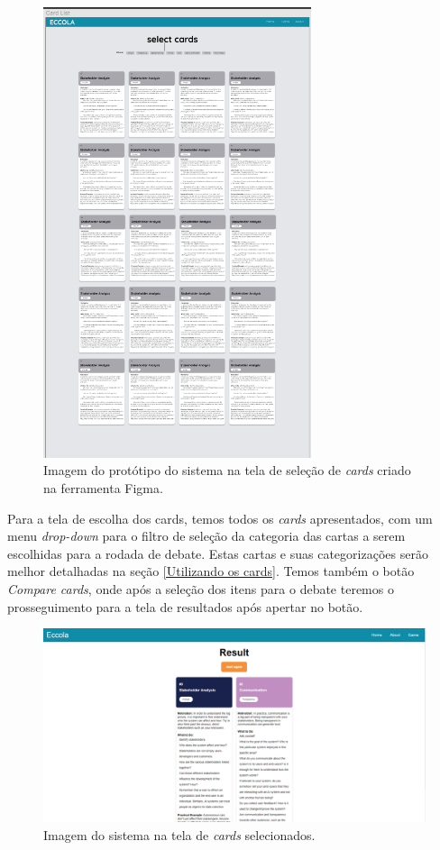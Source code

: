 \begin{figure}[h!]
    \centering
    \includegraphics[width=0.7\textwidth]{img/figma_cards.png}
    \caption{Imagem do protótipo do sistema na tela de seleção de \textit{cards} criado na ferramenta Figma.}
    \label{fig:figma_cards}
\end{figure}

Para a tela de escolha dos cards, temos todos os \textit{cards} apresentados, com um menu \textit{drop-down} para o filtro de seleção da categoria das cartas a serem escolhidas para a rodada de debate. Estas cartas e suas categorizações serão melhor detalhadas na seção \ref{Utilizando os cards}. Temos também o botão \textit{Compare cards}, onde após a seleção dos itens para o debate teremos o prosseguimento para a tela de resultados após apertar no botão.

\begin{figure}[h!]
    \centering
    \includegraphics[width=\textwidth]{img/eccola_results.png}
    \caption{Imagem do sistema na tela de \textit{cards} selecionados.}
    \label{fig:eccola_results}
\end{figure}

